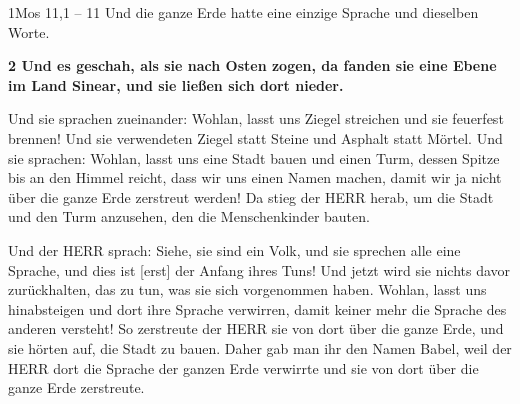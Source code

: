 \documentclass[aspectratio=43]{beamer}
\begin{document}
\begin{frame}  
    \vspace*{1cm}
        \begin{exampleblock}{1Mos 11,1 -- 11}
            \color{black}
            \small
            Und die ganze Erde hatte eine einzige Sprache und dieselben Worte.
            \begin{greenblock}
                \textbf{2 Und es geschah, als sie nach Osten zogen, da fanden sie eine Ebene im Land Sinear, und sie ließen sich dort nieder.}
            \end{greenblock}            
            Und sie sprachen zueinander: Wohlan, lasst uns Ziegel streichen und sie feuerfest brennen! Und sie verwendeten Ziegel statt Steine und Asphalt statt Mörtel.
            Und sie sprachen: Wohlan, lasst uns eine Stadt bauen und einen Turm, dessen Spitze bis an den Himmel reicht, dass wir uns einen Namen machen, damit wir ja nicht über die ganze Erde zerstreut werden!            
            Da stieg der HERR herab, um die Stadt und den Turm anzusehen, den die Menschenkinder bauten.
            
            Und der HERR sprach: Siehe, sie sind ein Volk, und sie sprechen alle eine Sprache, und dies ist [erst] der Anfang ihres Tuns! Und jetzt wird sie nichts davor zurückhalten, das zu tun, was sie sich vorgenommen haben.
            Wohlan, lasst uns hinabsteigen und dort ihre Sprache verwirren, damit keiner mehr die Sprache des anderen versteht!
            So zerstreute der HERR sie von dort über die ganze Erde, und sie hörten auf, die Stadt zu bauen.
            Daher gab man ihr den Namen Babel, weil der HERR dort die Sprache der ganzen Erde verwirrte und sie von dort über die ganze Erde zerstreute.  
        \end{exampleblock}  
    \vspace*{1cm}
\end{frame}
\end{document}
